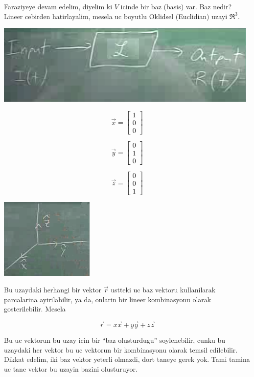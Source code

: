 \documentclass[12pt,fleqn]{article}
\begin{document}
Faraziyeye devam edelim, diyelim ki $V$ icinde bir baz (basis) var. Baz
nedir? Lineer cebirden hatirlayalim, mesela uc boyutlu Oklidsel (Euclidian)
uzayi $\Re^3$. 

\includegraphics[height=4cm]{1_5.png}


\[ 
\vec{x} = 
\left[\begin{array}{r}
1 \\ 0 \\ 0
\end{array}\right]
 \]

\[ 
\vec{y} = 
\left[\begin{array}{r}
0 \\ 1 \\ 0
\end{array}\right]
 \]

\[ 
\vec{z} = 
\left[\begin{array}{r}
0 \\ 0 \\ 1
\end{array}\right]
 \]

\includegraphics[height=4cm]{1_6.png}

Bu uzaydaki herhangi bir vektor $\vec{r}$ ustteki uc baz vektoru
kullanilarak parcalarina ayirilabilir, ya da, onlarin bir lineer
kombinasyonu olarak gosterilebilir. Mesela

\[ \vec{r} = x\vec{x} +  y\vec{y} +  z\vec{z} \]

Bu uc vektorun bu uzay icin bir ``baz olusturdugu'' soylenebilir, cunku bu
uzaydaki her vektor bu uc vektorun bir kombinasyonu olarak temsil
edilebilir. Dikkat edelim, iki baz vektor yeterli olmazdi, dort taneye
gerek yok. Tami tamina uc tane vektor bu uzayin bazini olusturuyor. 
\end{document}
